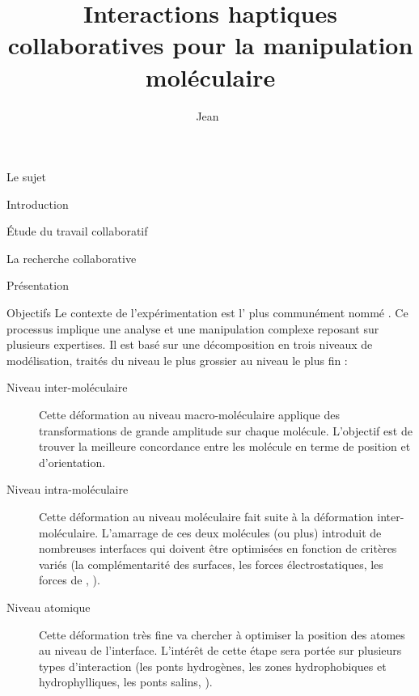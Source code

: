 \documentclass[myfrancais]{mythesis}
\title{Interactions haptiques collaboratives pour la manipulation moléculaire}
\author{Jean~\myname{Simard}}
\date{\mydate[datestyle=long]{01/12/2011}}
\begin{document}
	\frontmatter
	\maketitle
	\mytoc
	\mylof
	\mylot
	\mylotodo
	\mainmatter
	\begin{mypart}{Le sujet}
		\begin{mychapter}{Introduction}
		\end{mychapter}
	\end{mypart}
	\begin{mypart}{Étude du travail collaboratif}
		\begin{mychapter}{La recherche collaborative}
			\begin{mysection}{Présentation}
				\begin{mysubsection}{Objectifs}
					Le contexte de l'expérimentation est l' plus communément nommé .
					Ce processus implique une analyse et une manipulation complexe reposant sur plusieurs expertises.
					Il est basé sur une décomposition en trois niveaux de modélisation, traités du niveau le plus grossier au niveau le plus fin :
					\begin{description}
						\item[Niveau inter-moléculaire] Cette déformation au niveau macro-moléculaire applique des transformations de grande amplitude sur chaque molécule.
							L'objectif est de trouver la meilleure concordance entre les molécule en terme de position et d'orientation.
						\item[Niveau intra-moléculaire] Cette déformation au niveau moléculaire fait suite à la déformation inter-moléculaire.
							L'amarrage de ces deux molécules (ou plus) introduit de nombreuses interfaces qui doivent être optimisées en fonction de critères variés (la complémentarité des surfaces, les forces électrostatiques, les forces de  , \myetc).
						\item[Niveau atomique] Cette déformation très fine va chercher à optimiser la position des atomes au niveau de l'interface.
							L'intérêt de cette étape sera portée sur plusieurs types d'interaction (les ponts hydrogènes, les zones hydrophobiques et hydrophylliques, les ponts salins, \myetc).
					\end{description}


\end{mysubsection}
\end{mysection}
\end{mychapter}
\end{mypart}
\end{document}
